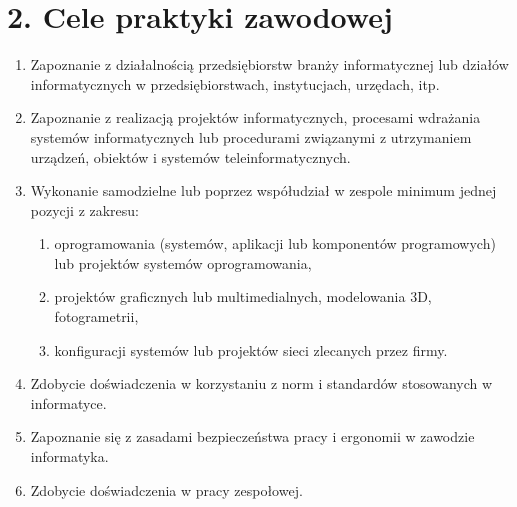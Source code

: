 \documentclass[12pt,a4paper]{article}
\begin{document}
\section*{2. Cele praktyki zawodowej}
\begin{enumerate}
    \item Zapoznanie z działalnością przedsiębiorstw branży informatycznej lub działów informatycznych w przedsiębiorstwach, instytucjach, urzędach, itp.
    \item Zapoznanie z realizacją projektów informatycznych, procesami wdrażania systemów informatycznych lub procedurami związanymi z utrzymaniem urządzeń, obiektów i systemów teleinformatycznych.
    \item Wykonanie samodzielne lub poprzez współudział w zespole minimum jednej pozycji z zakresu:
    \begin{enumerate}[label=\alph*)]
        \item oprogramowania (systemów, aplikacji lub komponentów programowych) lub projektów systemów oprogramowania,
        \item projektów graficznych lub multimedialnych, modelowania 3D, fotogrametrii,
        \item konfiguracji systemów lub projektów sieci zlecanych przez firmy.
    \end{enumerate}
    \item Zdobycie doświadczenia w korzystaniu z norm i standardów stosowanych w informatyce.
    \item Zapoznanie się z zasadami bezpieczeństwa pracy i ergonomii w zawodzie informatyka.
    \item Zdobycie doświadczenia w pracy zespołowej.
\end{enumerate}
\end{document}
